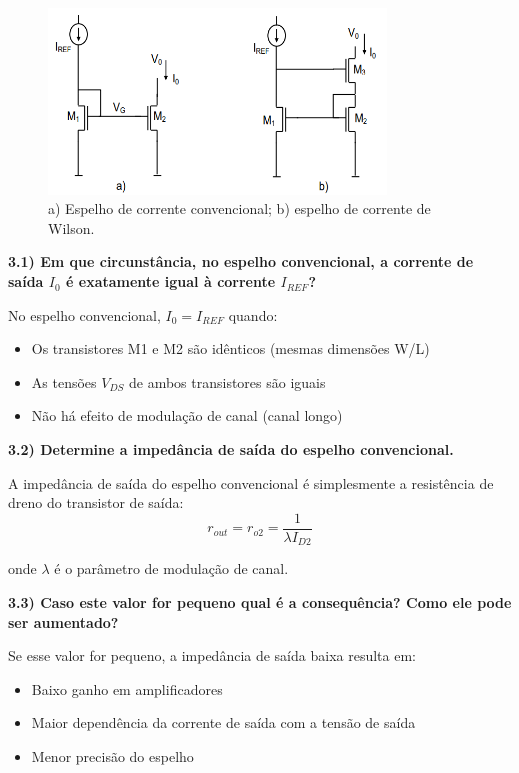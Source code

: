﻿\documentclass[12pt,a4paper]{article}
\begin{document}
\begin{figure}[H]
    \centering
    \includegraphics[width=0.8\textwidth]{espelho_a_b.png}
    \caption{a) Espelho de corrente convencional; b) espelho de corrente de Wilson.}
    \label{fig:espelhos_corrente}
\end{figure}

\textbf{3.1) Em que circunstância, no espelho convencional, a corrente de saída $I_0$ é exatamente igual à corrente $I_{REF}$?}

No espelho convencional, $I_0 = I_{REF}$ quando:
\begin{itemize}
    \item Os transistores M1 e M2 são idênticos (mesmas dimensões W/L)
    \item As tensões $V_{DS}$ de ambos transistores são iguais
    \item Não há efeito de modulação de canal (canal longo)
\end{itemize}

\textbf{3.2) Determine a impedância de saída do espelho convencional.}

A impedância de saída do espelho convencional é simplesmente a resistência de dreno do transistor de saída:
$$r_{out} = r_{o2} = \frac{1}{\lambda I_{D2}}$$

onde $\lambda$ é o parâmetro de modulação de canal.

\textbf{3.3) Caso este valor for pequeno qual é a consequência? Como ele pode ser aumentado?}

Se esse valor for pequeno, a impedância de saída baixa resulta em:
\begin{itemize}
    \item Baixo ganho em amplificadores
    \item Maior dependência da corrente de saída com a tensão de saída
    \item Menor precisão do espelho
\end{itemize}
\end{document}
